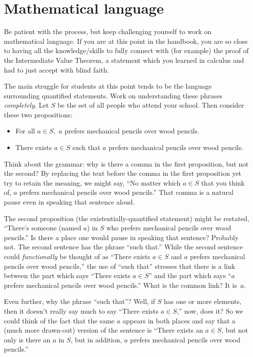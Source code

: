 \documentclass{book}
\theoremstyle{ekimcustom}
\begin{document}
\section{Mathematical language}

Be patient with the process, but keep challenging yourself to work on mathematical language. If you are at this point in the handbook, you are so close to having all the knowledge/skills to fully connect with (for example) the proof of the Intermediate Value Theorem, a statement which you learned in calculus and had to just accept with blind faith.

The main struggle for students at this point tends to be the language surrounding quantified statements. Work on understanding these phrases \emph{completely}. Let $S$ be the set of all people who attend your school. Then consider these two propositions:
\begin{itemize}
\item For all $a \in S$,\, $a$ prefers mechanical pencils over wood pencils.
\item There exists $a \in S$ such that $a$ prefers mechanical pencils over wood pencils.
\end{itemize}
Think about the grammar: why is there a comma in the first proposition, but not the second? By replacing the text before the comma in the first proposition yet try to retain the meaning, we might say, ``No matter which $a \in S$ that you think of, $a$ prefers mechanical pencils over wood pencils.'' That comma is a natural pause even in speaking that sentence aloud.

The second proposition (the existentially-quantified statement) might be restated, ``There's someone (named $a$) in $S$ who prefers mechanical pencils over wood pencils.'' Is there a place one would pause in speaking that sentence? Probably not. The second sentence has the phrase ``such that.'' While the second sentence could \emph{functionally} be thought of as ``There exists $a \in S$ and $a$ prefers mechanical pencils over wood pencils,'' the use of ``such that'' stresses that there is a link between the part which says ``There exists $a \in S$'' and the part which says ``$a$ prefers mechanical pencils over wood pencils.'' What is the common link? It is~$a$.

Even further, why the phrase ``such that''? Well, if $S$ has one or more elements, then it doesn't really say much to say ``There exists $a \in S$,'' now, does it? So we could think of the fact that the same $a$ appears in both places and say that a (much more drawn-out) version of the sentence is ``There exists an $a \in S$, but not only is there an $a$ in $S$, but in addition, $a$ prefers mechanical pencils over wood pencils.''
\end{document}
